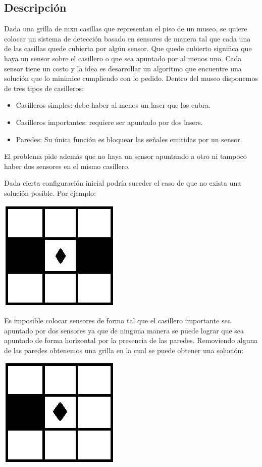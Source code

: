 \subsection{Descripción}

Dada una grilla de mxn casillas que representan el piso de un museo, se quiere colocar un sistema de detección basado en sensores de manera tal que cada una de las casillas quede cubierta por algún sensor. Que quede cubierto significa que haya un sensor sobre el casillero o que sea apuntado por al menos uno. Cada sensor tiene un costo y la idea es desarrollar un algoritmo que encuentre una solución que lo minimice cumpliendo con lo pedido.
Dentro del museo disponemos de tres tipos de casilleros:
\begin{itemize}
\item Casilleros simples: debe haber al menos un laser que los cubra.
\item Casilleros importantes: requiere ser apuntado por dos lasers.
\item Paredes: Su única función es bloquear las señales emitidas por un sensor.
\end{itemize}

El problema pide además que no haya un sensor apuntando a otro ni tampoco haber dos sensores en el mismo casillero.

Dada cierta configuración inicial podría suceder el caso de que no exista una solución posible. Por ejemplo:

\includegraphics[scale=0.6]{ej3/imgs/ejSinSolucion.png}

Es imposible colocar sensores de forma tal que el casillero importante sea apuntado por dos sensores ya que de ninguna manera se puede lograr que sea apuntado de forma horizontal por la presencia de las paredes. Removiendo alguna de las paredes obtenemos una grilla en la cual se puede obtener una solución:

\includegraphics[scale=0.6]{ej3/imgs/grillaConSolucion.png}

